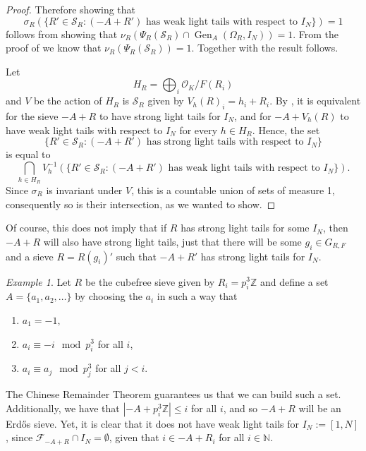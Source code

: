 \documentclass[a4paper,11pt,reqno]{amsart}
\theoremstyle{plain}
\theoremstyle{remark}
\newtheorem{example}[theorem]{Example}
\DeclareMathOperator{\Gen}{Gen}
\newcommand{\z}{\mathbb{Z}}
\newcommand{\co}{\mathcal{O}}
\newcommand{\cf}{\mathcal{F}}
\newcommand{\cs}{\mathcal{S}}
\newcommand{\grf}{G_{R,F}}
\begin{document}
\begin{proof}
				Therefore showing that $$\sigma_R(\{R'\in \cs_R: (-A+R') \text{ has weak light tails with respect to } I_N\}) = 1$$ follows from showing that $\nu_R(\Psi_R(\cs_R) \cap \Gen_A(\Omega_{R},I_N)) = 1$. From the proof of  we know that $\nu_R(\Psi_R(\cs_R)) = 1$. Together with  the result follows. 
				
				Let $$H_R = \bigoplus_i \co_K/F(R_i)$$ and $V$ be the action of $H_R$ is $\cs_R$ given by $V_h(R)_i = h_i+R_i$. By , it is equivalent for the sieve $-A+R$ to have strong light tails for $I_N$, and for $-A+V_h(R)$ to have weak light tails with respect to $I_N$ for every $h \in H_R$. Hence, the set $$\{R'\in \cs_R: (-A+R') \text{ has strong light tails with respect to } I_N\}$$ is equal to $$\bigcap_{h\in H_R} V_{h}^{-1}(\{R'\in \cs_R: (-A+R') \text{ has weak light tails with respect to } I_N\}).$$ Since $\sigma_R$ is invariant under $V$, this is a countable union of sets of measure 1, consequently so is their intersection, as we wanted to show.
			\end{proof}
			
			Of course, this does not imply that if $R$ has strong light tails for some $I_N$, then $-A+R$ will also have strong light tails, just that there will be some $g_i \in \grf$ and a sieve $R = R(g_i)'$ such that $-A+R'$ has strong light tails for $I_N$.
			
			\begin{example}
				Let $R$ be the cubefree sieve given by $R_i = p_i^3\z$ and define a set $A = \{a_1,a_2,\dots\}$ by choosing the $a_i$ in such a way that
				
				\begin{enumerate}
					\item $a_1 = -1,$
					\item $a_i \equiv -i \mod p_i^3$ for all $i$,
					\item $a_i \equiv a_j \mod p_j^3$ for all $j<i$.
					
				\end{enumerate} 
				
				The Chinese Remainder Theorem guarantees us that we can build such a set. Additionally, we have that $|-A+p_i^3\z| \leq i$ for all $i$, and so $-A+R$ will be an Erdős sieve. Yet, it is clear that it does not have weak light tails for $I_N := [1,N]$, since $\cf_{-A+R}\cap I_N = \emptyset$, given that $i \in -A+R_i$ for all $i \in \mathbb{N}$. 
			\end{example}
			
\end{document}
